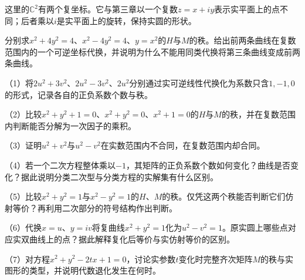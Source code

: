 这里的\(\mathbb C^2\)有两个复坐标。它与第三章以一个复数\(z=x+iy\)表示实平面上的点不同；后者乘以\(i\)是实平面上的旋转，保持实圆的形状。

\begin{example}
分别求\(x^2+4y^2=4\)、\(x^2-4y^2=4\)、\(y=x^2\)的\(H\)与\(M\)的秩。给出前两条曲线在复数范围内的一个可逆坐标代换，并说明为什么不能用同类代换将第三条曲线变成前两条曲线。
\end{example}

\begin{exercise}
\mbox{}

\begin{samepage}
（1）将\(2u^2+3v^2\)、\(2u^2-3v^2\)、\(2u^2\)分别通过实可逆线性代换化为系数只含\(1,-1,0\)的形式，记录各自的正负系数个数与秩。
\par
\end{samepage}

\begin{samepage}
（2）比较\(x^2+y^2+1=0\)、\(x^2+y^2=0\)、\(x^2+1=0\)的\(H\)与\(M\)的秩，并在复数范围内判断能否分解为一次因子的乘积。
\par
\end{samepage}

\begin{samepage}
（3）证明\(u^2+v^2\)与\(u^2-v^2\)在实数范围内不合同，在复数范围内却合同。
\par
\end{samepage}

\begin{samepage}
（4）若一个二次方程整体乘以\(-1\)，其矩阵的正负系数个数如何变化？曲线是否变化？据此说明分类二次型与分类方程的实解集有什么区别。
\par
\end{samepage}

\begin{samepage}
（5）比较\(x^2+y^2=1\)与\(x^2-y^2=1\)的\(H\)、\(M\)的秩。仅凭这两个秩能否判断它们仿射等价？再利用二次部分的符号结构作出判断。
\par
\end{samepage}

\begin{samepage}
（6）代换\(x=u\)、\(y=iv\)将复曲线\(x^2+y^2=1\)化为\(u^2-v^2=1\)。原实圆上哪些点对应实双曲线上的点？据此解释复化后等价与实仿射等价的区别。
\par
\end{samepage}

\begin{samepage}
（7）对方程\(x^2+y^2-2tx+1=0\)，讨论实参数\(t\)变化时完整齐次矩阵\(M\)的秩与实图形的类型，并说明代数退化发生在何时。
\par
\end{samepage}
\end{exercise}

